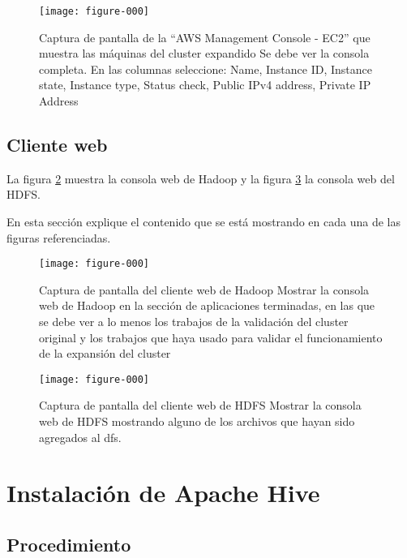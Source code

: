 \documentclass[12pt,letterpaper,twoside]{article}
\begin{document}
\begin{code}[H]

\end{code}

\begin{figure}
    \centering
    \texttt{[image: figure-000]}
    \caption{Captura de pantalla de la ``AWS Management Console - EC2'' que muestra las máquinas del cluster expandido
    {\color{red} Se debe ver la consola completa. En las columnas seleccione: Name, Instance ID, Instance state, Instance type, Status check, Public IPv4 address, Private IP Address}}
    \label{fig:002}
\end{figure}

\subsection{Cliente web}

La figura \ref{fig:003} muestra la consola web de Hadoop y la figura \ref{fig:004} la consola web del HDFS.

{\color{red} En esta sección explique el contenido que se está mostrando en cada una de las figuras referenciadas.}

\begin{figure}
    \centering
    \texttt{[image: figure-000]}
    \caption{Captura de pantalla del cliente web de Hadoop
    {\color{red} Mostrar la consola web de Hadoop en la sección de aplicaciones terminadas, en las que se debe ver a lo menos los trabajos de la validación del cluster original y los trabajos que haya usado para validar el funcionamiento de la expansión del cluster}}
    \label{fig:003}
\end{figure}

\begin{figure}
    \centering
    \texttt{[image: figure-000]}
    \caption{Captura de pantalla del cliente web de HDFS
    {\color{red} Mostrar la consola web de HDFS mostrando alguno de los archivos que hayan sido agregados al dfs.}}
    \label{fig:004}
\end{figure}

\section{Instalación de Apache Hive}

\subsection{Procedimiento}
\end{document}
